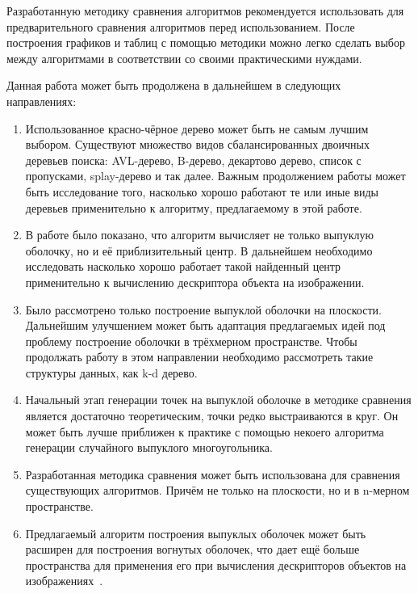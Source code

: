 Разработанную методику сравнения алгоритмов рекомендуется использовать для предварительного сравнения алгоритмов перед использованием. После построения графиков и таблиц с помощью методики можно легко сделать выбор между алгоритмами в соответствии со своими практическими нуждами.

Данная работа может быть продолжена в дальнейшем в следующих направлениях:
\begin{enumerate}
	\item Использованное красно-чёрное дерево может быть не самым лучшим выбором. Существуют множество видов сбалансированных двоичных деревьев поиска: AVL-дерево, B-дерево, декартово дерево, список с пропусками, splay-дерево и так далее\cite{neerc2010algorithms}. Важным продолжением работы может быть исследование того, насколько хорошо работают те или иные виды деревьев применительно к алгоритму, предлагаемому в этой работе.
	\item В работе было показано, что алгоритм вычисляет не только выпуклую оболочку, но и её приблизительный центр. В дальнейшем необходимо исследовать насколько хорошо работает такой найденный центр применительно к вычислению дескриптора объекта на изображении.
	\item Было рассмотрено только построение выпуклой оболочки на плоскости. Дальнейшим улучшением может быть адаптация предлагаемых идей под проблему построение оболочки в трёхмерном пространстве. Чтобы продолжать работу в этом направлении необходимо рассмотреть такие структуры данных, как k-d дерево\cite{bentley1975multidimensional}.
	\item Начальный этап генерации точек на выпуклой оболочке в методике сравнения является достаточно теоретическим, точки редко выстраиваются в круг. Он может быть лучше приближен к практике с помощью некоего алгоритма генерации случайного выпуклого многоугольника.
	\item Разработанная методика сравнения может быть использована для сравнения существующих алгоритмов. Причём не только на плоскости, но и в n-мерном пространстве.
	\item Предлагаемый алгоритм построения выпуклых оболочек может быть расширен для построения вогнутых оболочек, что дает ещё больше пространства для применения его при вычисления дескрипторов объектов на изображениях~\cite{braune2016obtaining}.
\end{enumerate}
